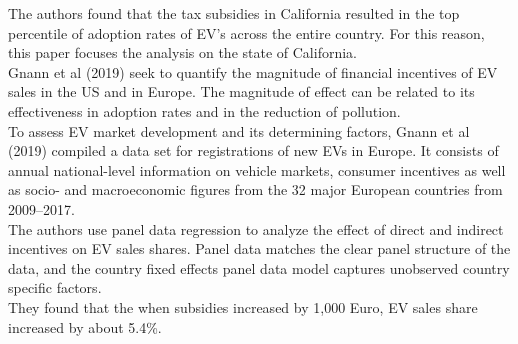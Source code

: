\documentclass[12pt]{article}
\newcommand\tab[1][.50cm]{\hspace*{#1}}
\begin{document}
\begin{multicols}{2}
\begin{align}
			\label{eqn:2}
		\end{align}
		\\
		The authors found that the tax subsidies in California resulted in the top percentile of adoption rates of EV's across the entire country. For this reason, this paper focuses the analysis on the state of California.\\
		\tab Gnann et al (2019) seek to quantify the magnitude of financial incentives of EV sales in the US and in Europe. The magnitude of effect can be related to its effectiveness in adoption rates and in the reduction of pollution.\\
		\tab To assess EV market development and its determining factors, Gnann et al (2019) compiled a data set for registrations of new EVs in Europe. It consists of annual national-level information on vehicle markets, consumer incentives as well as socio- and macroeconomic figures from the 32 major European countries from 2009–2017.\\
		\tab The authors use panel data regression to analyze the effect of direct and indirect incentives on EV sales shares. Panel data matches the clear panel structure of the data, and the country fixed effects panel data model captures unobserved country specific factors.\\
		\tab They found that the when subsidies increased by 1,000 Euro, EV sales share increased by about 5.4\%.
		

\end{multicols}
\end{document}
